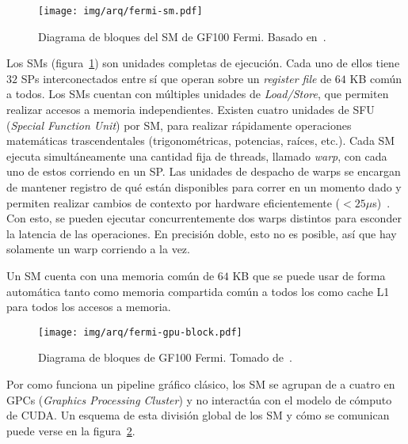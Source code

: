 \begin{figure}[htb]
    \centering
    \texttt{[image: img/arq/fermi-sm.pdf]}
    \caption{Diagrama de bloques del SM de GF100 Fermi. Basado en~\cite{NvidiaFermi}.}
    \label{fermi_sm}
\end{figure}

Los SMs (figura~\ref{fermi_sm}) son unidades completas de ejecuci\'on.
Cada uno de ellos tiene $32$ SPs interconectados entre s\'i que operan sobre un \emph{register file} de $64$ KB com\'un a todos.
Los SMs cuentan con m\'ultiples unidades de \emph{Load/Store}, que permiten realizar accesos a memoria independientes.
Existen cuatro unidades de SFU (\textit{Special Function Unit}) por SM, para realizar r\'apidamente operaciones matem\'aticas trascendentales (trigonom\'etricas, potencias, ra\'ices, etc.).
Cada SM ejecuta simult\'aneamente una cantidad fija de threads, llamado \textit{warp}, con cada uno de estos corriendo en un SP.
Las unidades de despacho de warps se encargan de mantener registro de qu\'e \threads{} est\'an disponibles para correr en un momento dado y permiten realizar cambios de contexto por hardware
eficientemente ($<25 \mu$s)~\cite{PattersonFermi}.
Con esto, se pueden ejecutar concurrentemente dos warps distintos para esconder la latencia de las operaciones.
En precisi\'on doble, esto no es posible, as\'i que hay solamente un warp corriendo a la vez.

Un SM cuenta con una memoria com\'un de $64$ KB que se puede usar de forma autom\'atica tanto como memoria compartida com\'un a todos los \threads{} como cache L1 para todos los accesos a memoria.

\begin{figure}[htb]
    \centering
    \texttt{[image: img/arq/fermi-gpu-block.pdf]}
    \caption{Diagrama de bloques de GF100 Fermi. Tomado de~\cite{NvidiaFermi}.}
    \label{fermi_gpu_block}
\end{figure}

Por como funciona un pipeline gr\'afico cl\'asico, los SM se agrupan de a cuatro en GPCs (\textit{Graphics Processing Cluster}) y no interact\'ua con el modelo de c\'omputo
de CUDA.
Un esquema de esta divisi\'on global de los SM y c\'omo se comunican puede verse en la figura~\ref{fermi_gpu_block}.


